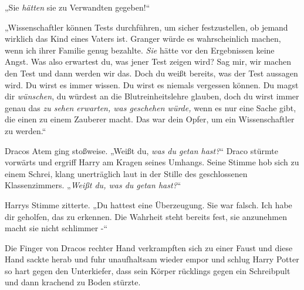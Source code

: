 „Sie \emph{hätten} sie zu Verwandten gegeben!“

„Wissenschaftler können Tests durchführen, um sicher festzustellen, ob jemand wirklich das Kind eines Vaters ist. Granger würde es wahrscheinlich machen, wenn ich ihrer Familie genug bezahlte. \emph{Sie} hätte vor den Ergebnissen keine Angst. Was also erwartest du, was jener Test zeigen wird? Sag mir, wir machen den Test und dann werden wir das. Doch du weißt bereits, was der Test aussagen wird. Du wirst es immer wissen. Du wirst es niemals vergessen können. Du magst dir \emph{wünschen}, du würdest an die Blutreinheitslehre glauben, doch du wirst immer genau das \emph{zu sehen erwarten, was geschehen würde,} wenn es nur eine Sache gibt, die einen zu einem Zauberer macht. Das war dein Opfer, um ein Wissenschaftler zu werden.“

Dracos Atem ging stoßweise. „Weißt du, \emph{was du getan hast?}“ Draco stürmte vorwärts und ergriff Harry am Kragen seines Umhangs. Seine Stimme hob sich zu einem Schrei, klang unerträglich laut in der Stille des geschlossenen Klassenzimmers. „\emph{Weißt du, was du getan hast?}“

Harrys Stimme zitterte. „Du hattest eine Überzeugung. Sie war falsch. Ich habe dir geholfen, das zu erkennen. Die Wahrheit steht bereits fest, sie anzunehmen macht sie nicht schlimmer -“

Die Finger von Dracos rechter Hand verkrampften sich zu einer Faust und diese Hand sackte herab und fuhr unaufhaltsam wieder empor und schlug Harry Potter so hart gegen den Unterkiefer, dass sein Körper rücklings gegen ein Schreibpult und dann krachend zu Boden stürzte.

